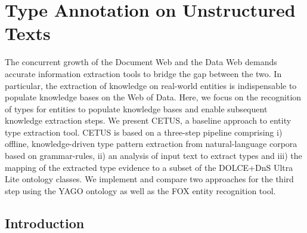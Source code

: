 




\chapter{Type Annotation on Unstructured Texts}


The concurrent growth of the Document Web and the Data Web demands accurate information extraction tools to bridge the gap between the two.
In particular, the extraction of knowledge on real-world entities is indispensable to populate knowledge bases on the Web of Data. 
Here, we focus on the recognition of types for entities to populate knowledge bases and enable subsequent knowledge extraction steps.
We present CETUS, a baseline approach to entity type extraction tool.
CETUS is based on a three-step pipeline comprising i) offline, knowledge-driven type pattern extraction from natural-language corpora based on grammar-rules, ii) an analysis of input text to extract types and iii) the mapping of the extracted type evidence to a subset of the DOLCE+DnS Ultra Lite ontology classes.
We implement and compare two approaches for the third step using the YAGO ontology as well as the FOX entity recognition tool.


\section{Introduction}

